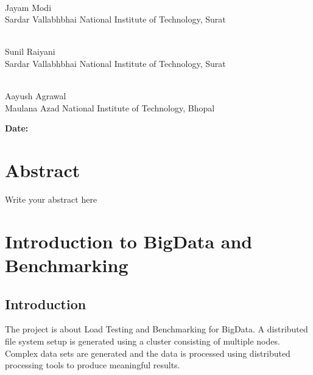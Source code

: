 \documentclass[12pt]{book}
\begin{document}
\vfill
\begin{flushright}

\underline{\hspace{5cm}} \\
Jayam Modi \\
Sardar Vallabhbhai National Institute of Technology, Surat \\

\vfill

\underline{\hspace{5cm}} \\
Sunil Raiyani  \\ 
Sardar Vallabhbhai National Institute of Technology, Surat \\

\vfill

\underline{\hspace{5cm}} \\
Aayush Agrawal \\
Maulana Azad National Institute of Technology, Bhopal \\

\vfill
\end{flushright}

\textbf{Date:} \underline{\hspace{5cm}}

\chapter*{Abstract}
\setcounter{page}{1}
Write your abstract here

\listoffigures
\listoftables
\tableofcontents

\pagebreak
\cleardoublepage

\setcounter{page}{1}

\chapter{Introduction to BigData and Benchmarking}
\section{Introduction}
The project is about Load Testing and Benchmarking for BigData. A distributed file system setup is generated using a cluster consisting of 
multiple nodes. Complex data sets are generated and the data is processed using distributed processing tools to produce meaningful results.
\\\noindent
\end{document}
